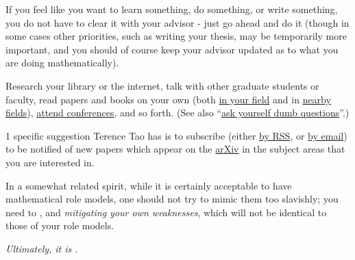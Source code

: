 \documentclass{book}
\numberwithin{equation}{section}
\begin{document}
%
If you feel like you want to learn something, do something, or write something, you do not have to clear it with your advisor - just go ahead and do it (though in some cases other priorities, such as writing your thesis, may be temporarily more important, and you should of course keep your advisor updated as to what you are doing mathematically).

Research your library or the internet, talk with other graduate students or faculty, read papers and books on your own (both \href{https://terrytao.wordpress.com/career-advice/learn-and-relearn-your-field/}{in your field} and in \href{https://terrytao.wordpress.com/career-advice/don't-be-afraid-to-learn-things-outside-your-field/}{nearby fields}), \href{https://terrytao.wordpress.com/career-advice/attend-talks-and-conferences-even-those-not-directly-related-to-your-work/}{attend conferences}, and so forth. (See also ``\href{https://terrytao.wordpress.com/career-advice/ask-yourself-dumb-questions-and-answer-them/}{ask yourself dumb questions}''.)

%
1 specific suggestion Terence Tao has is to subscribe (either \href{http://www.arxiv.org/help/rss}{by RSS}, or \href{http://arxiv.org/help/subscribe}{by email}) to be notified of new papers which appear on the \href{http://www.arxiv.org/}{arXiv} in the subject areas that you are interested in.

%
In a somewhat related spirit, while it is certainly acceptable to have mathematical role models, one should not try to mimic them too slavishly; you need to ,  and \textit{mitigating your own weaknesses}, which will not be identical to those of your role models.

\textit{Ultimately, it is .}
\end{document}
